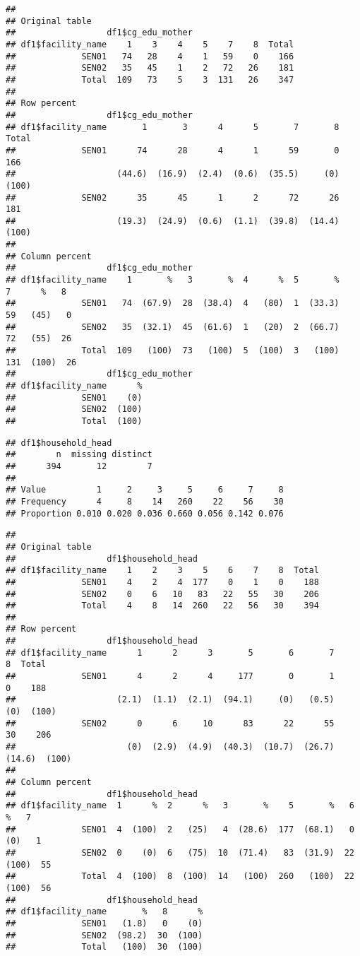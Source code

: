 \documentclass[
]{article}
\begin{document}
\begin{verbatim}
## 
## Original table 
##                  df1$cg_edu_mother
## df1$facility_name    1    3    4    5    7    8  Total
##             SEN01   74   28    4    1   59    0    166
##             SEN02   35   45    1    2   72   26    181
##             Total  109   73    5    3  131   26    347
## 
## Row percent 
##                  df1$cg_edu_mother
## df1$facility_name       1       3      4      5       7       8  Total
##             SEN01      74      28      4      1      59       0    166
##                    (44.6)  (16.9)  (2.4)  (0.6)  (35.5)     (0)  (100)
##             SEN02      35      45      1      2      72      26    181
##                    (19.3)  (24.9)  (0.6)  (1.1)  (39.8)  (14.4)  (100)
## 
## Column percent 
##                  df1$cg_edu_mother
## df1$facility_name    1       %   3       %  4      %  5       %    7      %   8
##             SEN01   74  (67.9)  28  (38.4)  4   (80)  1  (33.3)   59   (45)   0
##             SEN02   35  (32.1)  45  (61.6)  1   (20)  2  (66.7)   72   (55)  26
##             Total  109   (100)  73   (100)  5  (100)  3   (100)  131  (100)  26
##                  df1$cg_edu_mother
## df1$facility_name      %
##             SEN01    (0)
##             SEN02  (100)
##             Total  (100)
\end{verbatim}

\begin{verbatim}
## df1$household_head 
##        n  missing distinct 
##      394       12        7 
##                                                     
## Value          1     2     3     5     6     7     8
## Frequency      4     8    14   260    22    56    30
## Proportion 0.010 0.020 0.036 0.660 0.056 0.142 0.076
\end{verbatim}

\begin{verbatim}
## 
## Original table 
##                  df1$household_head
## df1$facility_name    1    2    3    5    6    7    8  Total
##             SEN01    4    2    4  177    0    1    0    188
##             SEN02    0    6   10   83   22   55   30    206
##             Total    4    8   14  260   22   56   30    394
## 
## Row percent 
##                  df1$household_head
## df1$facility_name      1      2      3       5       6       7       8  Total
##             SEN01      4      2      4     177       0       1       0    188
##                    (2.1)  (1.1)  (2.1)  (94.1)     (0)   (0.5)     (0)  (100)
##             SEN02      0      6     10      83      22      55      30    206
##                      (0)  (2.9)  (4.9)  (40.3)  (10.7)  (26.7)  (14.6)  (100)
## 
## Column percent 
##                  df1$household_head
## df1$facility_name  1      %  2      %   3       %    5       %   6      %   7
##             SEN01  4  (100)  2   (25)   4  (28.6)  177  (68.1)   0    (0)   1
##             SEN02  0    (0)  6   (75)  10  (71.4)   83  (31.9)  22  (100)  55
##             Total  4  (100)  8  (100)  14   (100)  260   (100)  22  (100)  56
##                  df1$household_head
## df1$facility_name       %   8      %
##             SEN01   (1.8)   0    (0)
##             SEN02  (98.2)  30  (100)
##             Total   (100)  30  (100)
\end{verbatim}
\end{document}
